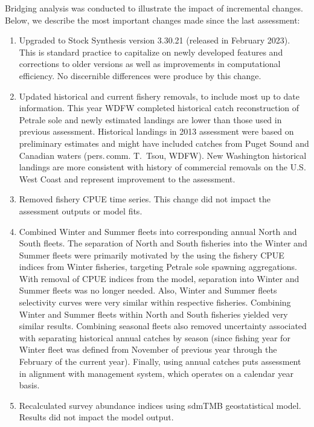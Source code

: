\documentclass[
]{scrartcl}
\begin{document}
Bridging analysis was conducted to illustrate the impact of incremental
changes. Below, we describe the most important changes made since the
last assessment:

\begin{enumerate}

\item Upgraded to Stock Synthesis version 3.30.21 (released in February 2023). This is standard practice to capitalize on newly developed features and corrections to older versions as well as improvements in computational efficiency.  No discernible differences were produce by this change.

\item Updated historical and current fishery removals, to include most up to date information. This year WDFW completed historical catch reconstruction of Petrale sole and newly estimated landings are lower than those used in previous assessment. Historical landings in 2013 assessment were based on preliminary estimates and might have included catches from Puget Sound and Canadian waters (pers.\,comm. T.\ Tsou, WDFW). New Washington historical landings are more consistent with history of commercial removals on the U.S. West Coast and represent improvement to the assessment. 

\item Removed fishery CPUE time series. This change did not impact the assessment outputs or model fits.

\item Combined Winter and Summer fleets into corresponding annual North and South fleets. The separation of North and South fisheries into the Winter and Summer fleets were primarily motivated by the using the fishery CPUE indices from Winter fisheries, targeting Petrale sole spawning aggregations. With removal of CPUE indices from the model, separation into Winter and Summer fleets was no longer needed. Also, Winter and Summer fleets selectivity curves were very similar within respective fisheries. Combining Winter and Summer fleets within North and South fisheries yielded very similar results. Combining seasonal fleets also removed uncertainty associated with separating historical annual catches by season (since fishing year for Winter fleet was defined from November of previous year through the February of the current year). Finally, using annual catches puts assessment in alignment with management system, which operates on a calendar year basis.  

\item Recalculated survey abundance indices using \textsf{sdmTMB} geostatistical model. Results did not impact the model output.


\end{enumerate}
\end{document}
